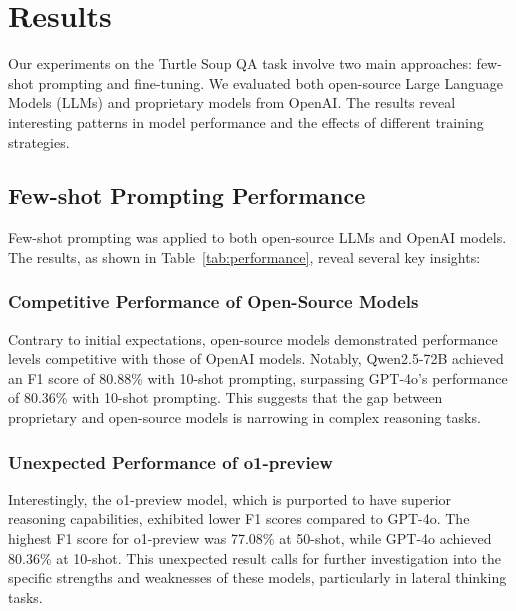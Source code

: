 \section{Results}
Our experiments on the Turtle Soup QA task involve two main approaches: few-shot prompting and fine-tuning. We evaluated both open-source Large Language Models (LLMs) and proprietary models from OpenAI. The results reveal interesting patterns in model performance and the effects of different training strategies.

\subsection{Few-shot Prompting Performance}
Few-shot prompting was applied to both open-source LLMs and OpenAI models. The results, as shown in Table~\ref{tab:performance}, reveal several key insights:

\subsubsection{Competitive Performance of Open-Source Models}
Contrary to initial expectations, open-source models demonstrated performance levels competitive with those of OpenAI models. Notably, Qwen2.5-72B achieved an F1 score of 80.88\% with 10-shot prompting, surpassing GPT-4o's performance of 80.36\% with 10-shot prompting. This suggests that the gap between proprietary and open-source models is narrowing in complex reasoning tasks.

\subsubsection{Unexpected Performance of o1-preview}
Interestingly, the o1-preview model, which is purported to have superior reasoning capabilities, exhibited lower F1 scores compared to GPT-4o. The highest F1 score for o1-preview was 77.08\% at 50-shot, while GPT-4o achieved 80.36\% at 10-shot. This unexpected result calls for further investigation into the specific strengths and weaknesses of these models, particularly in lateral thinking tasks.


